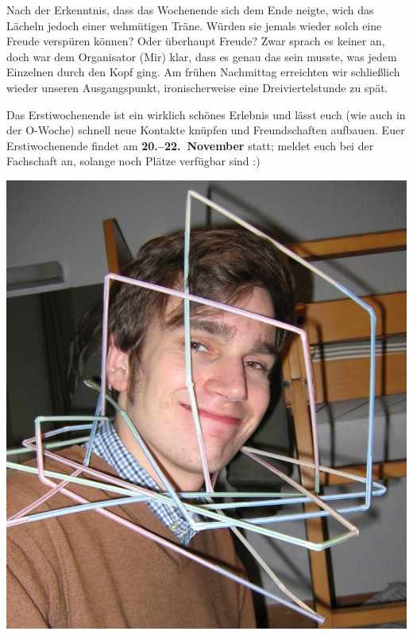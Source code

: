 \begin{multicols*}{2}
Nach der Erkenntnis, dass das Wochenende sich dem Ende neigte, wich das Lächeln jedoch einer wehmütigen Träne.
Würden sie jemals wieder solch eine Freude verspüren können?
Oder überhaupt Freude?
Zwar sprach es keiner an, doch war dem Organisator (Mir) klar, dass es genau das sein musste, was jedem Einzelnen durch den Kopf ging.
Am frühen Nachmittag erreichten wir schließlich wieder unseren Ausgangspunkt, ironischerweise eine Dreiviertelstunde zu spät. 

Das Erstiwochenende ist ein wirklich schönes Erlebnis und lässt euch (wie auch in der O-Woche) schnell neue Kontakte knüpfen und Freundschaften aufbauen.
Euer Erstiwochenende findet am \textbf{20.--22.~November} statt; meldet euch bei der Fachschaft an, solange noch Plätze verfügbar sind :)


\begin{center}
	\includegraphics[width=\columnwidth, height=0.3\textheight]{res/erstiwe/strohhalme.png}
\end{center}
\end{multicols*}

